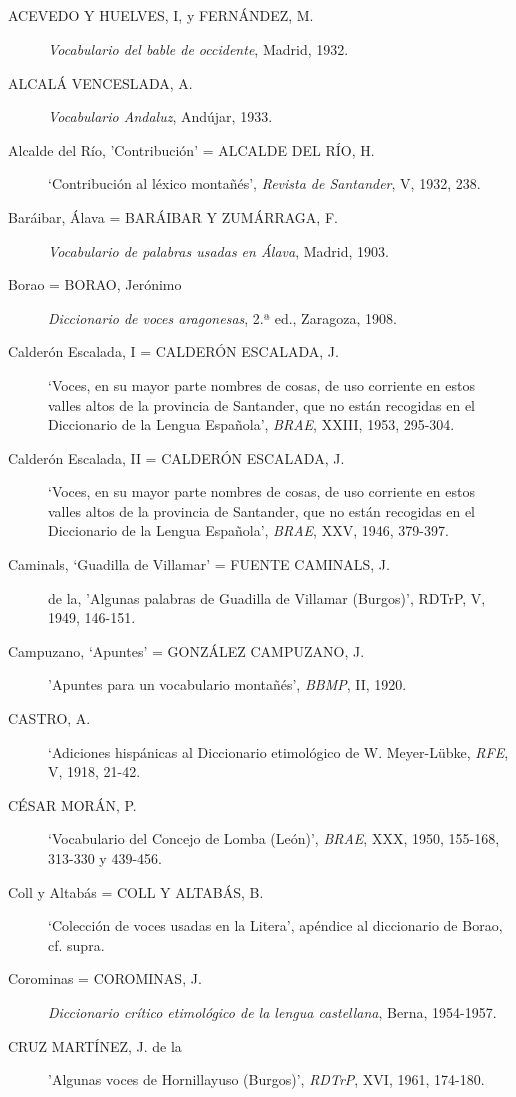 \documentclass[11pt,spanish,b5paper]{book}
\begin{document}
\subsection{} \begin{description}
\item[ACEVEDO Y HUELVES, I, y FERNÁNDEZ, M.] \textit{Vocabulario del bable de occidente}, Madrid, 1932.
\item[ALCALÁ VENCESLADA, A.] \textit{Vocabulario Andaluz}, Andújar, 1933.
\item[Alcalde del Río, 'Contribución' = ALCALDE DEL RÍO, H.] `Contribución al léxico montañés', \textit{Revista de Santander}, V, 1932, 238.
\item[Baráibar, Álava = BARÁIBAR Y ZUMÁRRAGA, F.] \textit{Vocabulario de palabras usadas en Álava}, Madrid, 1903.
\item[Borao = BORAO, Jerónimo] \textit{Diccionario de voces aragonesas}, 2.ª ed., Zaragoza, 1908.
\item[Calderón Escalada, I = CALDERÓN ESCALADA, J.] `Voces, en su mayor parte nombres de cosas, de uso corriente en estos valles altos de la provincia de Santander, que no están recogidas en el Diccionario de la Lengua Española', \textit{BRAE}, XXIII, 1953, 295-304. 
\item[Calderón Escalada, II = CALDERÓN ESCALADA, J.] `Voces, en su mayor parte nombres de cosas, de uso corriente en estos valles altos de la provincia de Santander, que no están recogidas en el Diccionario de la Lengua Española', \textit{BRAE}, XXV, 1946, 379-397.
\item[Caminals, `Guadilla de Villamar' = FUENTE CAMINALS, J.] de la, 'Algunas palabras de Guadilla de Villamar (Burgos)', RDTrP, V, 1949, 146-151.
\item[Campuzano, `Apuntes' = GONZÁLEZ CAMPUZANO, J.] 'Apuntes para un vocabulario montañés', \textit{BBMP}, II, 1920. 
\item[CASTRO, A.] `Adiciones hispánicas al Diccionario etimológico de W. Meyer-Lübke, \textit{RFE}, V, 1918, 21-42. 
\item[CÉSAR MORÁN, P.] `Vocabulario del Concejo de Lomba (León)', \textit{BRAE}, XXX, 1950, 155-168, 313-330 y 439-456.
\item[Coll y Altabás =  COLL Y ALTABÁS, B.] `Colección de voces usadas en la Litera', apéndice al diccionario de Borao, cf. supra. 
\item[Corominas = COROMINAS, J.] \textit{Diccionario crítico etimológico de la lengua castellana}, Berna, 1954-1957.
\item[CRUZ MARTÍNEZ, J. de la] 'Algunas voces de Hornillayuso (Burgos)',  \textit{RDTrP}, XVI, 1961, 174-180.

\end{description}
\end{document}
